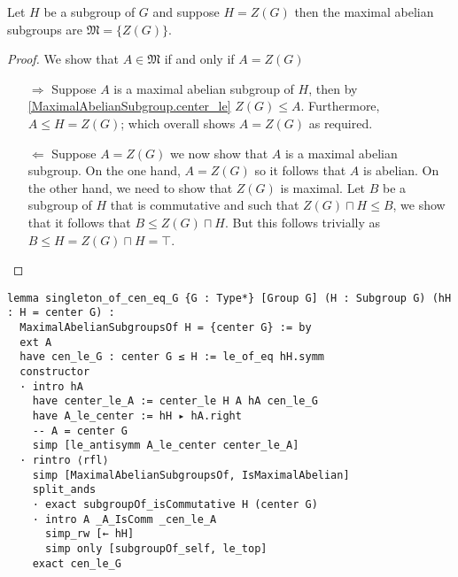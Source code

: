 \begin{lemma}
\label{MaximalAbelianSubgroup.singleton_of_cen_eq_G}
\leanok
Let $H$ be a subgroup of $G$ and suppose $H = Z(G)$ then the maximal abelian subgroups are $\mathfrak{M} = \{Z(G)\}$.
\end{lemma}
\begin{proof}
  \leanok
  We show that $A \in \mathfrak{M}$ if and only if $A = Z(G)$
  \begin{itemize}
    \item[$\Rightarrow$] Suppose $A$ is a maximal abelian subgroup of $H$, then by \ref{MaximalAbelianSubgroup.center_le} $Z(G) \le A$. Furthermore, $A \le H = Z(G)$; which overall shows $A = Z(G)$ as required.
    \item[$\Leftarrow$] Suppose $A = Z(G)$ we now show that $A$ is a maximal abelian subgroup. 
      On the one hand, $A = Z(G)$ so it follows that $A$ is abelian.
      On the other hand, we need to show that $Z(G)$ is maximal. Let $B$ be a subgroup of $H$ that is commutative and such that $Z(G) \sqcap H \le B$, we show that it follows that $B \le Z(G) \sqcap H$. But this follows trivially as 
      $B \leq H = Z(G) \sqcap H = \top$.
  \end{itemize}
\end{proof}
\begin{footnotesize}
\begin{verbatim}
lemma singleton_of_cen_eq_G {G : Type*} [Group G] (H : Subgroup G) (hH : H = center G) :
  MaximalAbelianSubgroupsOf H = {center G} := by
  ext A
  have cen_le_G : center G ≤ H := le_of_eq hH.symm
  constructor
  · intro hA
    have center_le_A := center_le H A hA cen_le_G
    have A_le_center := hH ▸ hA.right
    -- A = center G
    simp [le_antisymm A_le_center center_le_A]
  · rintro ⟨rfl⟩
    simp [MaximalAbelianSubgroupsOf, IsMaximalAbelian]
    split_ands
    · exact subgroupOf_isCommutative H (center G)
    · intro A _A_IsComm _cen_le_A
      simp_rw [← hH]
      simp only [subgroupOf_self, le_top]
    exact cen_le_G
\end{verbatim}
\end{footnotesize}


